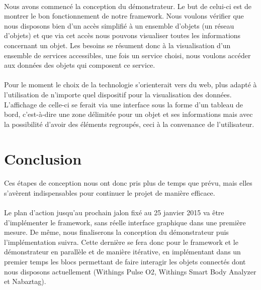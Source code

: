 \documentclass[nocopyrightspace]{sigplanconf}
\begin{document}
	\paragraph{}
	Nous avons commencé la conception du démonstrateur. Le but de celui-ci est de montrer le bon fonctionnement de notre framework. Nous voulons vérifier que nous disposons bien d’un accès simplifié à un ensemble d’objets (un réseau d’objets) et que via cet accès nous pouvons visualiser toutes les informations concernant un objet. Les besoins se résument donc à la visualisation d’un ensemble de services accessibles, une fois un service choisi, nous voulons accéder aux données des objets qui composent ce service.

	\paragraph{}
	Pour le moment le choix de la technologie s’orienterait vers du web, plus adapté à l’utilisation de n’importe quel dispositif pour la visualisation des données. L’affichage de celle-ci se ferait via une interface sous la forme d’un tableau de bord, c’est-à-dire une zone délimitée pour un objet et ses informations mais avec la possibilité d’avoir des éléments regroupés, ceci à la convenance de l’utilisateur.

\section{Conclusion}
	\paragraph{}
	Ces étapes de conception nous ont donc pris plus de temps que prévu, mais elles s'avèrent indispensables pour continuer le projet de manière efficace.

	\paragraph{}
	Le plan d'action jusqu'au prochain jalon fixé au 25 janvier 2015 va être d'implémenter le framework, sans réelle interface graphique dans une première mesure. De même, nous finaliserons la conception du démonstrateur puis l'implémentation suivra. Cette dernière se fera donc pour le framework et le démonstrateur en parallèle et de manière itérative, en implémentant dans un premier temps les blocs permettant de faire interagir les objets connectés dont nous disposons actuellement (Withings Pulse O2, Withings Smart Body Analyzer et Nabaztag).
\end{document}
